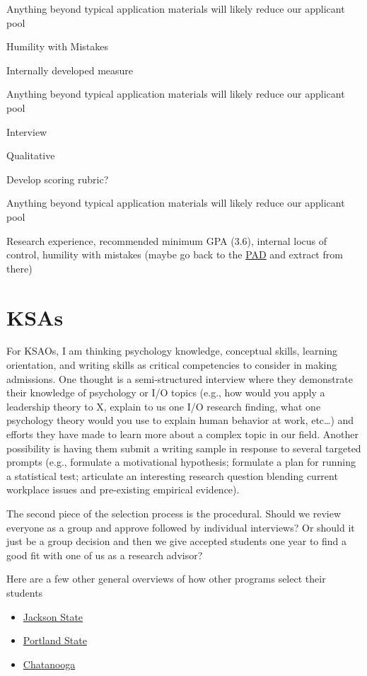 \documentclass[
]{book}
\providecommand{\tightlist}{%
  \setlength{\itemsep}{0pt}\setlength{\parskip}{0pt}}
\begin{document}
Anything beyond typical application materials will likely reduce our applicant pool

Humility with Mistakes

Internally developed measure

Anything beyond typical application materials will likely reduce our applicant pool

Interview

Qualitative

Develop scoring rubric?

Anything beyond typical application materials will likely reduce our applicant pool

Research experience, recommended minimum GPA (3.6), internal locus of control, humility with mistakes (maybe go back to the \href{https://docs.google.com/document/d/1eXTDvfQWcNplMgt8zbVZldw-ByelTlfpzYORBGq423c/edit?usp=sharing}{PAD} and extract from there)

\hypertarget{ksa}{%
\section{KSAs}\label{ksa}}

For KSAOs, I am thinking psychology knowledge, conceptual skills, learning orientation, and writing skills as critical competencies to consider in making admissions. One thought is a semi-structured interview where they demonstrate their knowledge of psychology or I/O topics (e.g., how would you apply a leadership theory to X, explain to us one I/O research finding, what one psychology theory would you use to explain human behavior at work, etc\ldots) and efforts they have made to learn more about a complex topic in our field. Another possibility is having them submit a writing sample in response to several targeted prompts (e.g., formulate a motivational hypothesis; formulate a plan for running a statistical test; articulate an interesting research question blending current workplace issues and pre-existing empirical evidence).

The second piece of the selection process is the procedural. Should we review everyone as a group and approve followed by individual interviews? Or should it just be a group decision and then we give accepted students one year to find a good fit with one of us as a research advisor?

Here are a few other general overviews of how other programs select their students

\begin{itemize}
\tightlist
\item
  \href{http://www.jsums.edu/psychology/ph-d-in-clinical-psychology-student-admission-outcomes-and-other-data/forms/}{Jackson State}
\item
  \href{https://www.pdx.edu/psy/graduate-faqs\#faq09.htm}{Portland State}
\item
  \href{https://www.utc.edu/psychology/graduate/msiopysch/ioadmissionscriteria.php}{Chatanooga}
\end{itemize}
\end{document}

